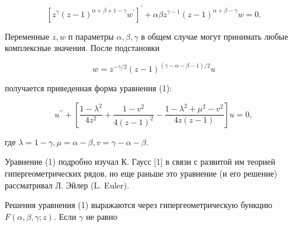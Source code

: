 \documentclass[10pt]{article}
\begin{document}
\[

\left[z^{\gamma}(z-1)^{\alpha+\beta+1-\gamma} w^{\prime}\right]^{\prime}+\alpha \beta z^{\gamma-1}(z-1)^{\alpha+\beta-\gamma} w=0 .

\]



Переменные $z, w$ п параметры $\alpha, \beta, \gamma$ в общем случае могут принимать любые комплексные значения. После подстановки



\[

w=z^{-\gamma / 2}(z-1)^{(\gamma-\alpha-\beta-1) / 2} u

\]



получается приведенная форма уравнения (1):



\[

u^{\prime \prime}+\left[\frac{1-\lambda^{2}}{4 z^{2}}+\frac{1-v^{2}}{4(z-1)^{2}}-\frac{1-\lambda^{2}+\mu^{2}-v^{2}}{4 z(z-1)}\right] u=0,

\]



где $\lambda=1-\gamma, \mu=\alpha-\beta, v=\gamma-\alpha-\beta$.



Уравнение (1) подробно изучал К. Гаусс [1] в связи с развитой им теорией гипергеометрических рядов, но еще раньше это уравнение (и его решение) рассматривал Л. Эйлер (L. Euler).



Решения уравнения (1) выражаются через гипергеометрическую бункцию $F(\alpha, \beta, \gamma ; z)$. Если $\gamma$ не равно
\end{document}
